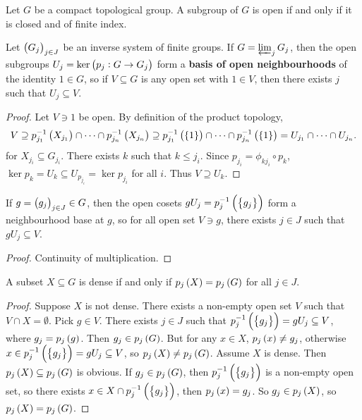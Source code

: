\begin{proposition}
Let $ G $ be a compact topological group. A subgroup of $ G $ is open if and only if it is closed and of finite index.
\end{proposition}

\begin{proposition}
\label{prop:1.2.28}
Let $ \br{G_j}_{j \in J} $ be an inverse system of finite groups. If $ G = \varprojlim_j G_j $, then the open subgroups $ U_j = \ker \br{p_j : G \to G_j} $ form a \textbf{basis of open neighbourhoods} of the identity $ 1 \in G $, so if $ V \subseteq G $ is any open set with $ 1 \in V $, then there exists $ j $ such that $ U_j \subseteq V $.
\end{proposition}

\begin{proof}
Let $ V \ni 1 $ be open. By definition of the product topology,
$$ V \supseteq p_{j_1}^{-1}\br{X_{j_1}} \cap \dots \cap p_{j_n}^{-1}\br{X_{j_n}} \supseteq p_{j_1}^{-1}\br{\cbr{1}} \cap \dots \cap p_{j_n}^{-1}\br{\cbr{1}} = U_{j_1} \cap \dots \cap U_{j_n}. $$
for $ X_{j_i} \subseteq G_{j_i} $. There exists $ k $ such that $ k \le j_i $. Since $ p_{j_i} = \phi_{kj_i} \circ p_k $, $ \ker p_k = U_k \subseteq U_{p_{j_i}} = \ker p_{j_i} $ for all $ i $. Thus $ V \supseteq U_k $.
\end{proof}


\begin{corollary}
If $ g = \br{g_j}_{j \in J} \in G $, then the open cosets $ gU_j = p_j^{-1}\br{\cbr{g_j}} $ form a neighbourhood base at $ g $, so for all open set $ V \ni g $, there exists $ j \in J $ such that $ gU_j \subseteq V $.
\end{corollary}

\begin{proof}
Continuity of multiplication.
\end{proof}

\begin{corollary}
\label{cor:1.2.30}
A subset $ X \subseteq G $ is dense if and only if $ p_j\br{X} = p_j\br{G} $ for all $ j \in J $.
\end{corollary}

\begin{proof}
Suppose $ X $ is not dense. There exists a non-empty open set $ V $ such that $ V \cap X = \emptyset $. Pick $ g \in V $. There exists $ j \in J $ such that $ p_j^{-1}\br{\cbr{g_j}} = gU_j \subseteq V $, where $ g_j = p_j\br{g} $. Then $ g_j \in p_j\br{G} $. But for any $ x \in X $, $ p_j\br{x} \ne g_j $, otherwise $ x \in p_j^{-1}\br{\cbr{g_j}} = gU_j \subseteq V $, so $ p_j\br{X} \ne p_j\br{G} $. Assume $ X $ is dense. Then $ p_j\br{X} \subseteq p_j\br{G} $ is obvious. If $ g_j \in p_j\br{G} $, then $ p_j^{-1}\br{\cbr{g_j}} $ is a non-empty open set, so there exists $ x \in X \cap p_j^{-1}\br{\cbr{g_j}} $, then $ p_j\br{x} = g_j $. So $ g_j \in p_j\br{X} $, so $ p_j\br{X} = p_j\br{G} $.
\end{proof}


